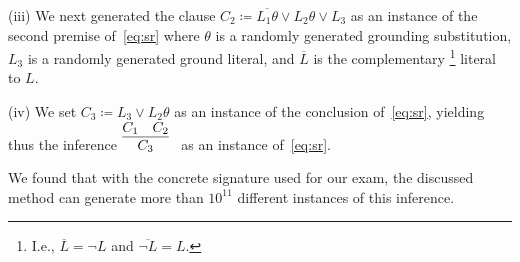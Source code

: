 
\noindent (iii)  We next generated the clause
$C_2 \coloneqq \overline{L_1\theta} \lor L_2\theta \lor L_3$
as an instance of the second premise of~\eqref{eq:sr}
where $\theta$ is a randomly generated grounding substitution,
$L_3$ is a randomly generated ground literal,
and
$\overline{L}$ is the complementary%
\footnote{I.e., $\overline{L} = \lnot L$ and $\overline{\lnot L} = L$.}
literal to $L$.\smallskip

\noindent (iv)
We set $C_3 \coloneqq L_3 \lor L_2\theta$ as an instance of the
conclusion of~\eqref{eq:sr}, yielding thus the inference $\infer[]{
      C_3
      }{
      C_1
      &
      {C_2}}$ as an instance of~\eqref{eq:sr}.\smallskip





We found that with the concrete signature used for our exam,
the discussed method can generate more than $10^{11}$ different instances
of this inference.
